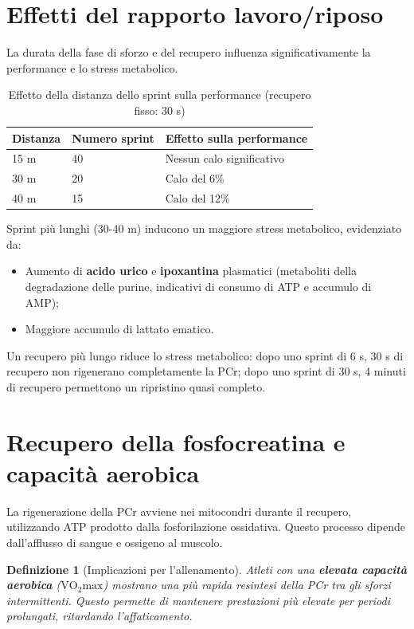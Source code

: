 \documentclass[12pt,a4paper]{report}
\newtheorem{definizione}{Definizione}[section]
\begin{document}
\section{Effetti del rapporto lavoro/riposo}
La durata della fase di sforzo e del recupero influenza significativamente la performance e lo stress metabolico.
\begin{table}[htbp]
\centering
\caption{Effetto della distanza dello sprint sulla performance (recupero fisso: 30 s)}
\label{tab:sprint-distanza}
\renewcommand{\arraystretch}{1.2}
\begin{tabular}{@{} p{} p{} p{} @{}}
\toprule
\textbf{Distanza} & \textbf{Numero sprint} & \textbf{Effetto sulla performance} \\
\midrule
15 m & 40 & Nessun calo significativo \\
30 m & 20 & Calo del 6\% \\
40 m & 15 & Calo del 12\% \\
\bottomrule
\end{tabular}
\end{table}
Sprint più lunghi (30-40 m) inducono un maggiore stress metabolico, evidenziato da:
\begin{itemize}
\item Aumento di \textbf{acido urico} e \textbf{ipoxantina} plasmatici (metaboliti della degradazione delle purine, indicativi di consumo di ATP e accumulo di AMP);
\item Maggiore accumulo di lattato ematico.
\end{itemize}
Un recupero più lungo riduce lo stress metabolico: dopo uno sprint di 6 s, 30 s di recupero non rigenerano completamente la PCr; dopo uno sprint di 30 s, 4 minuti di recupero permettono un ripristino quasi completo.

\section{Recupero della fosfocreatina e capacità aerobica}
La rigenerazione della PCr avviene nei mitocondri durante il recupero, utilizzando ATP prodotto dalla fosforilazione ossidativa. Questo processo dipende dall'afflusso di sangue e ossigeno al muscolo.
\begin{definizione}[Implicazioni per l'allenamento]
Atleti con una \textbf{elevata capacità aerobica} (\(\mathrm{VO_2max}\)) mostrano una più rapida resintesi della PCr tra gli sforzi intermittenti. Questo permette di mantenere prestazioni più elevate per periodi prolungati, ritardando l'affaticamento.
\end{definizione}
\end{document}
